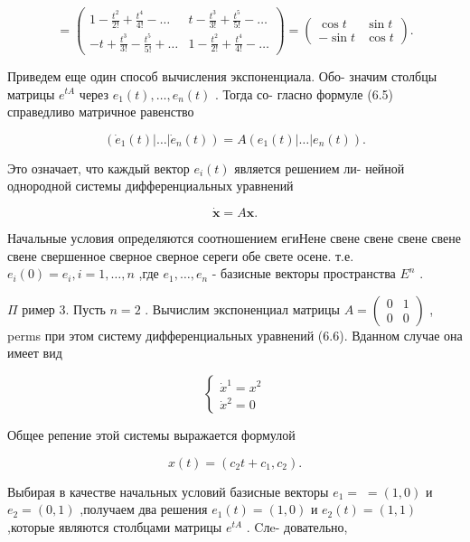 \documentclass[8pt]{extarticle}
\begin{document}
\[
= \left( \begin{array}{cc} 1 - \frac{{t}^{2}}{2!} + \frac{{t}^{4}}{4!} - \ldots & t - \frac{{t}^{3}}{3!} + \frac{{t}^{5}}{5!} - \ldots \\   - t + \frac{{t}^{3}}{3!} - \frac{{t}^{5}}{5!} + \ldots & 1 - \frac{{t}^{2}}{2!} + \frac{{t}^{4}}{4!} - \ldots \end{array}\right)  = \left( \begin{array}{cc} \cos t & \sin t \\   - \sin t & \cos t \end{array}\right) .
\]

Приведем еще один способ вычисления экспоненциала. Обо- значим столбцы матрицы \({e}^{tA}\) через \({e}_{1}\left( t\right) ,\ldots ,{e}_{n}\left( t\right)\) . Тогда со- гласно формуле (6.5) справедливо матричное равенство

\[
\left( {{\dot{e}}_{1}\left( t\right) \left| \ldots \right| {\dot{e}}_{n}\left( t\right) }\right)  = A\left( {{e}_{1}\left( t\right) \left| \ldots \right| {e}_{n}\left( t\right) }\right) .
\]

Это означает, что каждый вектор \({e}_{i}\left( t\right)\) является решением ли- нейной однородной системы дифференциальных уравнений

\[
\dot{\mathbf{x}} = A\mathbf{x}. \tag{6.6}
\]

Начальные условия определяются соотношением егиНене свене свене свене свене свене свершенное сверное сверное сереги обе свете осене. т.е. \({e}_{i}\left( 0\right)  = {e}_{i},i = 1,\ldots ,n\) ,где \({e}_{1},\ldots ,{e}_{n}\) - базисные векторы пространства \({E}^{n}\) .

\(\Pi\) ример 3. Пусть \(n = 2\) . Вычислим экспоненциал матрицы \(A = \left( \begin{array}{ll} 0 & 1 \\  0 & 0 \end{array}\right)\) , perms при этом систему дифференциальных уравнений (6.6). Вданном случае она имеет вид

\[
\left\{  \begin{array}{l} {\dot{x}}^{1} = {x}^{2} \\  {\dot{x}}^{2} = 0 \end{array}\right.
\]

Общее репение этой системы выражается формулой

\[
x\left( t\right)  = \left( {{c}_{2}t + {c}_{1},{c}_{2}}\right) .
\]

Выбирая в качестве начальных условий базисные векторы \({e}_{1} = \; = \left( {1,0}\right)\) и \({e}_{2} = \left( {0,1}\right)\) ,получаем два решения \({e}_{1}\left( t\right)  = \left( {1,0}\right)\) и \({e}_{2}\left( t\right)  = \left( {1,1}\right)\) ,которые являются столбцами матрицы \({e}^{tA}\) . Cлe- довательно,
\end{document}

